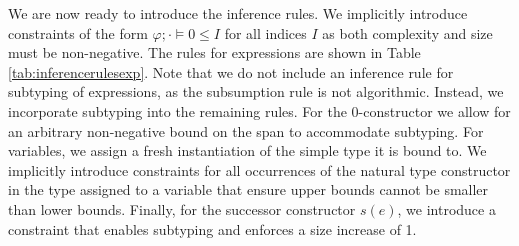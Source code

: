%
%
%
We are now ready to introduce the inference rules. We implicitly introduce constraints of the form $\varphi;\cdot\vDash 0 \leq I$ for all indices $I$ as both complexity and size must be non-negative. The rules for expressions are shown in Table \ref{tab:inferencerulesexp}. Note that we do not include an inference rule for subtyping of expressions, as the subsumption rule is not algorithmic. Instead, we incorporate subtyping into the remaining rules. For the 0-constructor we allow for an arbitrary non-negative bound on the span to accommodate subtyping. For variables, we assign a fresh instantiation of the simple type it is bound to. We implicitly introduce constraints for all occurrences of the natural type constructor in the type assigned to a variable that ensure upper bounds cannot be smaller than lower bounds. Finally, for the successor constructor $s(e)$, we introduce a constraint that enables subtyping and enforces a size increase of 1. \\

